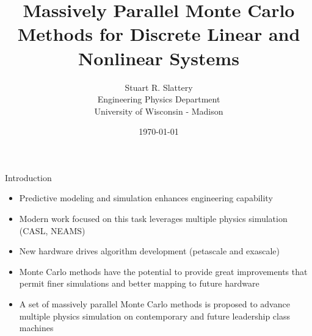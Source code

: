 \documentclass{beamer}
\author{Stuart R. Slattery
  \\ Engineering Physics Department
  \\ University of Wisconsin - Madison
}
\date{\today}
\title{Massively Parallel Monte Carlo Methods for Discrete Linear and
  Nonlinear Systems}
\begin{document}
\maketitle

\begin{frame}{Introduction}

  \begin{itemize}
  \item Predictive modeling and simulation enhances engineering
    capability
    \medskip
  \item Modern work focused on this task leverages multiple physics
    simulation (CASL, NEAMS)
    \medskip
  \item New hardware drives algorithm development (petascale and
    exascale)
    \medskip
  \item Monte Carlo methods have the potential to provide great
    improvements that permit finer simulations and better mapping to
    future hardware
    \medskip
  \item A set of massively parallel Monte Carlo methods is proposed to
    advance multiple physics simulation on contemporary and future
    leadership class machines
  \end{itemize}

\end{frame}
\end{document}
